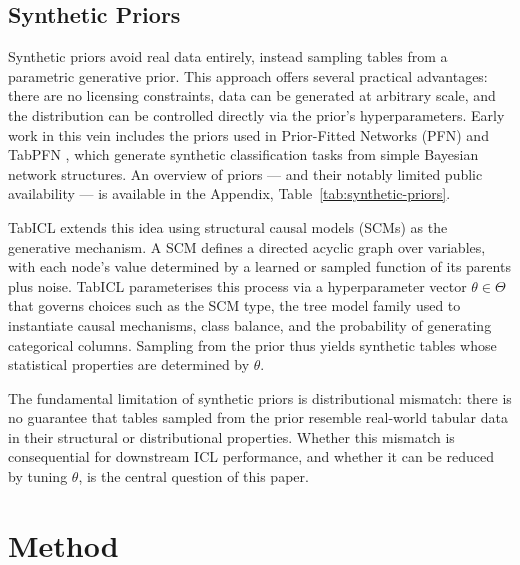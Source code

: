 \documentclass{article}
\begin{document}
\subsection{Synthetic Priors}

Synthetic priors avoid real data entirely, instead sampling tables from a parametric generative prior. This approach offers several practical advantages: there are no licensing constraints, data can be generated at arbitrary scale, and the distribution can be controlled directly via the prior's hyperparameters. Early work in this vein includes the priors used in Prior-Fitted Networks (PFN) and TabPFN \cite{hollmannAccuratePredictionsSmall2025}, which generate synthetic classification tasks from simple Bayesian network structures.
An overview of priors --- and their notably limited public availability --- is available in the Appendix, Table~\ref{tab:synthetic-priors}.

TabICL \cite{quTabICLTabularFoundation2025} extends this idea using structural causal models (SCMs) as the generative mechanism. A SCM defines a directed acyclic graph over variables, with each node's value determined by a learned or sampled function of its parents plus noise. TabICL parameterises this process via a hyperparameter vector $\theta \in \Theta$ that governs choices such as the SCM type, the tree model family used to instantiate causal mechanisms, class balance, and the probability of generating categorical columns. Sampling from the prior thus yields synthetic tables whose statistical properties are determined by $\theta$.

The fundamental limitation of synthetic priors is distributional mismatch: there is no guarantee that tables sampled from the prior resemble real-world tabular data in their structural or distributional properties. Whether this mismatch is consequential for downstream ICL performance, and whether it can be reduced by tuning $\theta$, is the central question of this paper.

\section{Method}
\label{sec:method}
\end{document}
